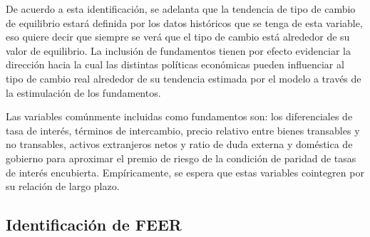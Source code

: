\documentclass[12pt,letterpaper]{article}
\begin{document}
De acuerdo a esta identificación, se adelanta que la tendencia de tipo de cambio de equilibrio estará definida por los datos históricos que se tenga de esta variable, eso quiere decir que siempre se verá que el tipo de cambio está alrededor de su valor de equilibrio. La inclusión de fundamentos tienen por efecto evidenciar la dirección hacia la cual las distintas políticas económicas pueden influenciar al tipo de cambio real alrededor de su tendencia estimada por el modelo a través de la estimulación de los fundamentos.

Las variables comúnmente incluidas como fundamentos son: los diferenciales de tasa de interés, términos de intercambio, precio relativo entre bienes transables y no transables, activos extranjeros netos y ratio de duda externa y doméstica de gobierno para aproximar el premio de riesgo de la condición de paridad de tasas de interés encubierta. Empíricamente, se espera que estas variables cointegren por su relación de largo plazo.

\subsection{Identificación de FEER}
\end{document}

